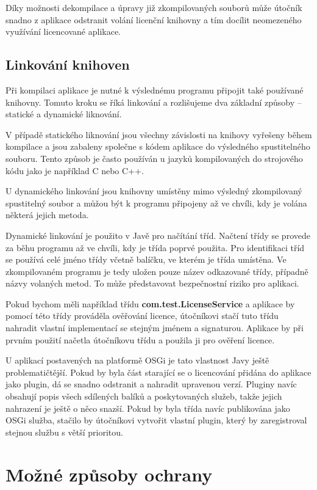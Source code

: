 Díky možnosti dekompilace a úpravy již zkompilovaných souborů může útočník
snadno z aplikace odstranit volání licenční knihovny a tím docílit neomezeného
využívání licencované aplikace.

\subsection{Linkování knihoven}

Při kompilaci aplikace je nutné k výslednému programu připojit také používané
knihovny. Tomuto kroku se říká linkování a rozlišujeme dva základní způsoby –
statické a dynamické liknování.

V případě statického liknování jsou všechny závislosti na knihovy vyřešeny během
kompilace a jsou zabaleny společne s kódem aplikace do výsledného spustitelného
souboru. Tento způsob je často používán u jazyků kompilovaných do strojového
kódu jako je například C nebo C++.

U dynamického linkování jsou knihovny umístěny mimo výsledný zkompilovaný
spustitelný soubor a můžou být k programu připojeny až ve chvíli, kdy je volána
některá jejich metoda. 

Dynamické linkování je použito v Javě pro načítání tříd. Načtení třídy se
provede za běhu programu až ve chvíli, kdy je třída poprvé použita. Pro
identifikaci tříd se používá celé jméno třídy včetně balíčku, ve kterém je třída
umístěna. Ve zkompilovaném programu je tedy uložen pouze název odkazované třídy,
případně názvy volaných metod. To může představovat bezpečnostní riziko pro
aplikaci.

Pokud bychom měli například třídu \textbf{com.test.LicenseService} a aplikace by
pomocí této třídy prováděla ověřování licence, útočníkovi stačí tuto třídu
nahradit vlastní implementací se stejným jménem a signaturou. Aplikace by při
prvním použití načetla útočníkovu třídu a použila ji pro ověření licence.

U aplikací postavených na platformě \gls{OSGi} je tato vlastnost Javy ještě
problematičtější. Pokud by byla část starající se o licencování přidána do
aplikace jako plugin, dá se snadno odstranit a nahradit upravenou verzí. Pluginy
navíc obsahují popis všech sdílených balíků a poskytovaných služeb, takže jejich
nahrazení je ještě o něco snazší. Pokud by byla třída navíc publikována jako
\gls{OSGi} služba, stačilo by útočníkovi vytvořit vlastní plugin, který by
zaregistroval stejnou službu s větší prioritou.


\section{Možné způsoby ochrany}

